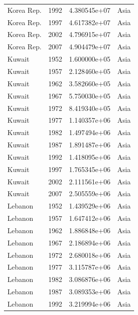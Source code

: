\documentclass[
  letterpaper,
  DIV=11,
  numbers=noendperiod]{scrreprt}
\begin{document}
\begin{tcolorbox}
\begin{tabular}{lrrl}
Korea Rep.               &  1992 &  4.380545e+07 &      Asia \\
Korea Rep.               &  1997 &  4.617382e+07 &      Asia \\
Korea Rep.               &  2002 &  4.796915e+07 &      Asia \\
Korea Rep.               &  2007 &  4.904479e+07 &      Asia \\
Kuwait                   &  1952 &  1.600000e+05 &      Asia \\
Kuwait                   &  1957 &  2.128460e+05 &      Asia \\
Kuwait                   &  1962 &  3.582660e+05 &      Asia \\
Kuwait                   &  1967 &  5.750030e+05 &      Asia \\
Kuwait                   &  1972 &  8.419340e+05 &      Asia \\
Kuwait                   &  1977 &  1.140357e+06 &      Asia \\
Kuwait                   &  1982 &  1.497494e+06 &      Asia \\
Kuwait                   &  1987 &  1.891487e+06 &      Asia \\
Kuwait                   &  1992 &  1.418095e+06 &      Asia \\
Kuwait                   &  1997 &  1.765345e+06 &      Asia \\
Kuwait                   &  2002 &  2.111561e+06 &      Asia \\
Kuwait                   &  2007 &  2.505559e+06 &      Asia \\
Lebanon                  &  1952 &  1.439529e+06 &      Asia \\
Lebanon                  &  1957 &  1.647412e+06 &      Asia \\
Lebanon                  &  1962 &  1.886848e+06 &      Asia \\
Lebanon                  &  1967 &  2.186894e+06 &      Asia \\
Lebanon                  &  1972 &  2.680018e+06 &      Asia \\
Lebanon                  &  1977 &  3.115787e+06 &      Asia \\
Lebanon                  &  1982 &  3.086876e+06 &      Asia \\
Lebanon                  &  1987 &  3.089353e+06 &      Asia \\
Lebanon                  &  1992 &  3.219994e+06 &      Asia \\

\end{tabular}
\end{tcolorbox}
\end{document}
